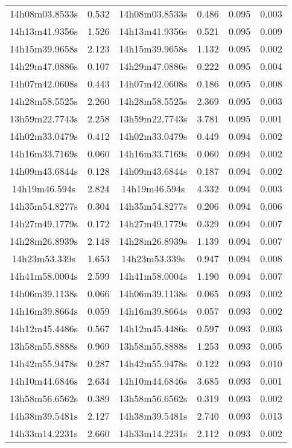 \begin{table}
\begin{tabular}{cccccc}
14h08m03.8533s & 0.532 & 14h08m03.8533s & 0.486 & 0.095 & 0.003 \\
14h13m41.9356s & 1.526 & 14h13m41.9356s & 0.521 & 0.095 & 0.009 \\
14h15m39.9658s & 2.123 & 14h15m39.9658s & 1.132 & 0.095 & 0.002 \\
14h29m47.0886s & 0.107 & 14h29m47.0886s & 0.222 & 0.095 & 0.004 \\
14h07m42.0608s & 0.443 & 14h07m42.0608s & 0.186 & 0.095 & 0.008 \\
14h28m58.5525s & 2.260 & 14h28m58.5525s & 2.369 & 0.095 & 0.003 \\
13h59m22.7743s & 2.258 & 13h59m22.7743s & 3.781 & 0.095 & 0.001 \\
14h02m33.0479s & 0.412 & 14h02m33.0479s & 0.449 & 0.094 & 0.002 \\
14h16m33.7169s & 0.060 & 14h16m33.7169s & 0.060 & 0.094 & 0.002 \\
14h09m43.6844s & 0.128 & 14h09m43.6844s & 0.187 & 0.094 & 0.002 \\
14h19m46.594s & 2.824 & 14h19m46.594s & 4.332 & 0.094 & 0.003 \\
14h35m54.8277s & 0.304 & 14h35m54.8277s & 0.206 & 0.094 & 0.006 \\
14h27m49.1779s & 0.172 & 14h27m49.1779s & 0.329 & 0.094 & 0.007 \\
14h28m26.8939s & 2.148 & 14h28m26.8939s & 1.139 & 0.094 & 0.007 \\
14h23m53.339s & 1.653 & 14h23m53.339s & 0.947 & 0.094 & 0.008 \\
14h41m58.0004s & 2.599 & 14h41m58.0004s & 1.190 & 0.094 & 0.007 \\
14h06m39.1138s & 0.066 & 14h06m39.1138s & 0.065 & 0.093 & 0.002 \\
14h16m39.8664s & 0.059 & 14h16m39.8664s & 0.057 & 0.093 & 0.002 \\
14h12m45.4486s & 0.567 & 14h12m45.4486s & 0.597 & 0.093 & 0.003 \\
13h58m55.8888s & 0.969 & 13h58m55.8888s & 1.253 & 0.093 & 0.005 \\
14h42m55.9478s & 0.287 & 14h42m55.9478s & 0.122 & 0.093 & 0.010 \\
14h10m44.6846s & 2.634 & 14h10m44.6846s & 3.685 & 0.093 & 0.001 \\
13h58m56.6562s & 0.389 & 13h58m56.6562s & 0.319 & 0.093 & 0.002 \\
14h38m39.5481s & 2.127 & 14h38m39.5481s & 2.740 & 0.093 & 0.013 \\
14h33m14.2231s & 2.660 & 14h33m14.2231s & 2.112 & 0.093 & 0.002 \\

\end{tabular}
\end{table}
